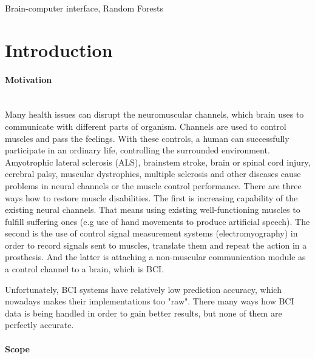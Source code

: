 \documentclass[12pt]{article}
\newcommand{\TODO}{\todo[inline]}
\begin{document}
\vspace*{3ex}
{}
Brain-computer interface, Random Forests
\vspace*{3ex}



\newpage
\tableofcontents

\newpage
\section{Introduction}
\paragraph{Motivation}~\\

Many health issues can disrupt the neuromuscular channels, which brain uses to communicate with different parts of organism. Channels are used to control muscles and pass the feelings. With these controls, a human can successfully participate in an ordinary life, controlling the surrounded environment. Amyotrophic lateral sclerosis (ALS), brainstem stroke, brain or spinal cord injury, cerebral palsy, muscular dystrophies, multiple sclerosis and other diseases cause problems in neural channels or the muscle control performance. There are three ways how to restore muscle disabilities. The first is increasing capability of the existing neural channels. That means using existing well-functioning muscles to fulfill suffering ones (e.g use of hand movements to produce artificial speech). The second is the use of control signal measurement systems (electromyography) in order to record signals sent to muscles, translate them and repeat the action in a prosthesis. And the latter is attaching a non-muscular communication module as a control channel to a brain, which is BCI.\cite{bci_jonathan}

Unfortunately, BCI systems have relatively low prediction accuracy, which nowadays makes their implementations too "raw". There many ways how BCI data is being handled in order to gain better results, but none of them are perfectly accurate.
\paragraph{Scope}~\\
\end{document}
